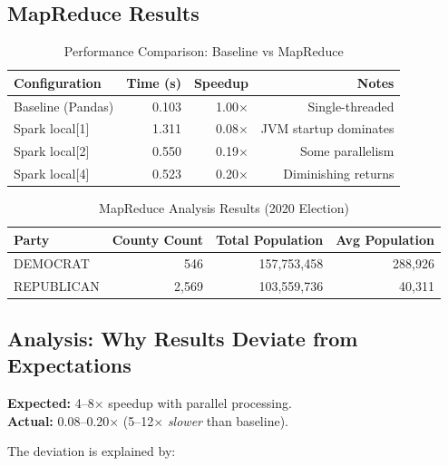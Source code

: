 \documentclass[9pt,a4paper,onecolumn,twoside]{tau-class/tau}
\begin{document}
\subsection{MapReduce Results}

\begin{table}[htbp]
\centering
\caption{Performance Comparison: Baseline vs MapReduce}
\label{tab:mapreduce}
\begin{tabular}{lrrr}
\hline
Configuration & Time (s) & Speedup & Notes \\
\hline
Baseline (Pandas) & 0.103 & 1.00$\times$ & Single-threaded \\
Spark local[1] & 1.311 & 0.08$\times$ & JVM startup dominates \\
Spark local[2] & 0.550 & 0.19$\times$ & Some parallelism \\
Spark local[4] & 0.523 & 0.20$\times$ & Diminishing returns \\
\hline
\end{tabular}
\end{table}

\begin{table}[htbp]
\centering
\caption{MapReduce Analysis Results (2020 Election)}
\label{tab:mr_results}
\begin{tabular}{lrrr}
\hline
Party & County Count & Total Population & Avg Population \\
\hline
DEMOCRAT & 546 & 157,753,458 & 288,926 \\
REPUBLICAN & 2,569 & 103,559,736 & 40,311 \\
\hline
\end{tabular}
\end{table}

\subsection{Analysis: Why Results Deviate from Expectations}

\textbf{Expected:} 4--8$\times$ speedup with parallel processing.\\
\textbf{Actual:} 0.08--0.20$\times$ (5--12$\times$ \textit{slower} than baseline).

The deviation is explained by:
\end{document}
